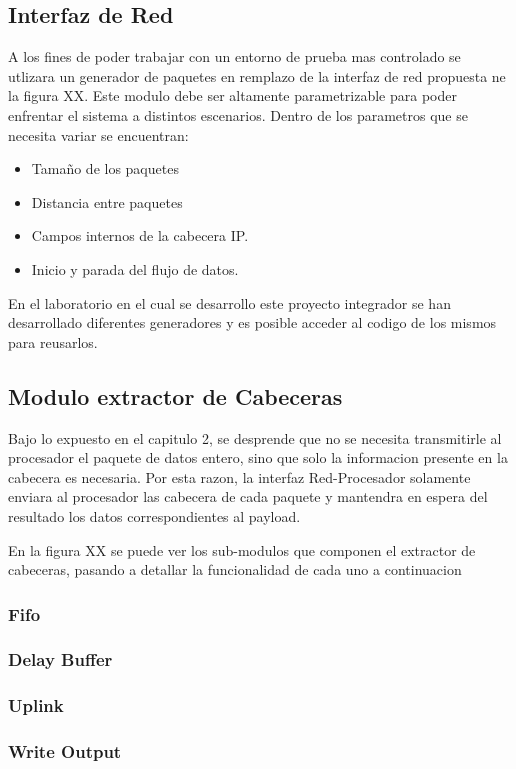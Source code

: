 \subsection{Interfaz de Red}
A los fines de poder trabajar con un entorno de prueba mas controlado se utlizara un generador de paquetes en remplazo de la interfaz de red propuesta ne la figura XX. 
Este modulo debe ser altamente parametrizable para poder enfrentar el sistema a distintos escenarios. Dentro de los parametros que se necesita variar se encuentran:

\begin{itemize}
	\item Tamaño de los paquetes 
	\item Distancia entre paquetes
	\item Campos internos de la cabecera IP. 
	\item Inicio y parada del flujo de datos. 
\end{itemize}

En el laboratorio en el cual se desarrollo este proyecto integrador se han desarrollado diferentes generadores y es posible acceder al codigo de los mismos para reusarlos. 

\subsection{Modulo extractor de Cabeceras}
Bajo lo expuesto en el capitulo 2, se desprende que no se necesita transmitirle al procesador el paquete de datos entero, sino que solo la informacion presente en la cabecera es necesaria. Por esta razon, la interfaz Red-Procesador solamente enviara al procesador las cabecera de cada paquete y mantendra en espera del resultado los datos correspondientes al payload. 

En la figura XX se puede ver los sub-modulos que componen el extractor de cabeceras, pasando a detallar la funcionalidad de cada uno a continuacion

\subsubsection{Fifo}
\subsubsection{Delay Buffer}
\subsubsection{Uplink}
\subsubsection{Write Output}

